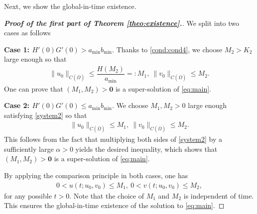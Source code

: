 \documentclass[a4paper,11pt]{amsart}
\theoremstyle{definition}
\def\O{\Omega}
\numberwithin{equation}{section}
\theoremstyle{definition}
\def\O{\Omega}
\begin{document}
Next, we show the global-in-time existence.


\begin{proof}[\bf Proof of the first part of  Theorem \ref{theo:existence}.]
We split into two cases as follows


\textbf{Case 1: $H'(0)G'(0)>a_{\min}b_{\min}$}. Thanks to \ref{cond:cond4}, we choose $M_2>K_2$ large enough so that
\begin{align*}
\|u_0\|_{C(\overline{\O})}\leq \dfrac{H(M_2)}{a_{\min}}=:M_1,~\|v_0\|_{C(\overline{\O})}\leq M_2.
\end{align*}
One can prove that $(M_1,M_2)>\textbf{0}$ is a super-solution of \eqref{eq:main}.

\textbf{Case 2: $H'(0)G'(0)\leq a_{\min}b_{\min}$}. We choose $M_1,M_2>0$ large enough satisfying \eqref{system2}  so that
\begin{align*}
\|u_0\|_{C(\overline{\O})}\leq M_1,~\|v_0\|_{C(\overline{\O})}\leq M_2.
\end{align*} 
This follows from the fact that multiplying both sides of \eqref{system2} by a sufficiently large $\alpha>0$ yields the desired inequality, which shows that $(M_1,M_2)>\mathbf{0}$ is a super-solution of \eqref{eq:main}.

By applying the comparison principle in both cases, one has
\begin{align*}
0< u(t;u_0,v_0)\leq M_1,~0< v(t;u_0,v_0)\leq M_2,
\end{align*}
for any possible $t>0$. Note that the choice of $M_1$ and $M_2$ is independent of time. This ensures the global-in-time existence of the solution to \eqref{eq:main}.

\end{proof}
\end{document}
